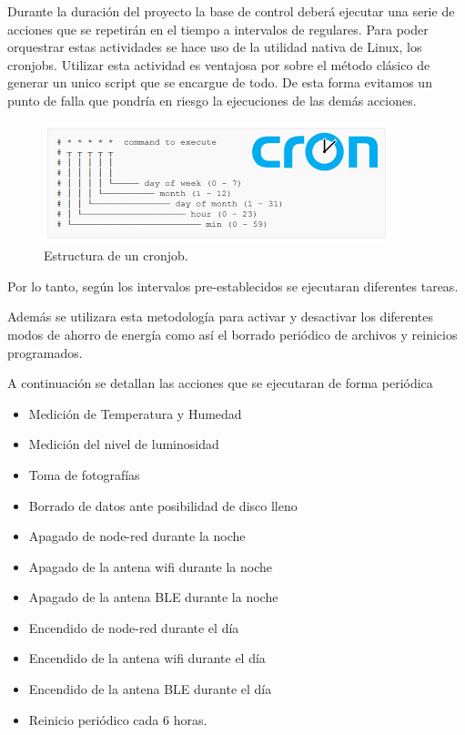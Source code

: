 Durante la duración del proyecto la base de control deberá ejecutar una serie de acciones que se repetirán en el tiempo a intervalos de regulares. Para poder orquestrar estas actividades se hace uso de la utilidad nativa de Linux, los cronjobs. 
Utilizar esta actividad es ventajosa por sobre el método clásico de generar un unico script que se encargue de todo. De esta forma evitamos un punto de falla que pondría en riesgo la ejecuciones de las demás acciones. 

\begin{figure}[H]
	\centering
	\includegraphics[width=0.7\linewidth]{"../Ingenieria de Detalle/ImagenesIngenieria de Detalle/cron"}
	\caption{Estructura de un cronjob.}
	\label{fig:cron}
\end{figure}

Por lo tanto, según los intervalos pre-establecidos se ejecutaran diferentes tareas.

Además se utilizara esta metodología para activar y desactivar los diferentes modos de ahorro de energía como así el borrado periódico de archivos y reinicios programados.

A continuación se detallan las acciones que se ejecutaran de forma periódica  
\begin{itemize}
	\item Medición de Temperatura y Humedad
	\item Medición del nivel de luminosidad
	\item Toma de fotografías
	\item Borrado de datos ante posibilidad de disco lleno
	\item Apagado de node-red durante la noche
	\item Apagado de la antena wifi durante la noche
	\item Apagado de la antena BLE durante la noche
	\item Encendido de node-red durante el día
	\item Encendido de la antena wifi durante el día
	\item Encendido de la antena BLE durante el día
	\item Reinicio periódico cada 6 horas.
\end{itemize}










